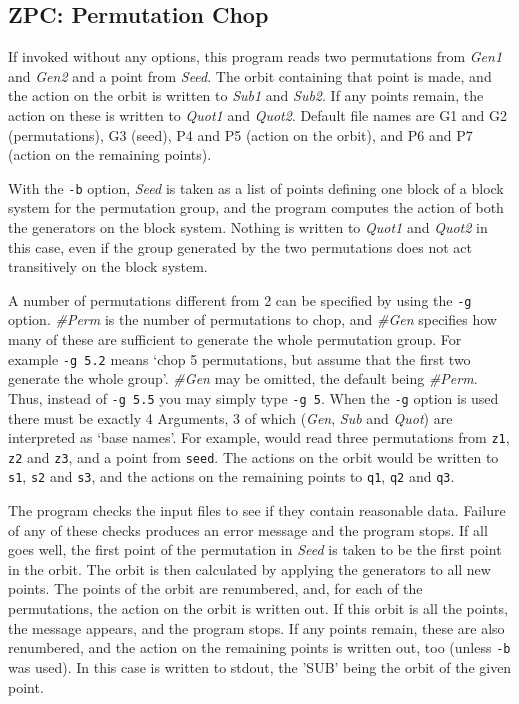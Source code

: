 \subsection{ZPC: Permutation Chop}
\Syntax
{}

\Description
If invoked without any options, this program reads two permutations
from {\it Gen1} and {\it Gen2} and a point from {\it Seed}. The orbit
containing that point is made, and the action on the orbit is written
to {\it Sub1} and {\it Sub2}. If any points remain, the action on these
is written to {\it Quot1} and {\it Quot2}.
Default file names are G1 and G2 (permutations), G3 (seed), P4 and P5
(action on the orbit), and P6 and P7 (action on the remaining points).

With the {\tt -b} option, {\it Seed} is taken as a list of points
defining one block of a block system for the permutation group, and
the program computes the action of both the generators on the block
system. Nothing is written to {\it Quot1} and {\it Quot2} in this case,
even if the group generated by the two permutations does not act
transitively on the block system.

A number of permutations different from 2 can be specified by using the
{\tt -g} option. {\it \#Perm} is the number of permutations to chop, and
{\it \#Gen} specifies how many of these are sufficient to generate the
whole permutation group. For example {\tt -g 5.2} means `chop 5
permutations, but assume that the first two generate the whole group'.
{\it \#Gen} may be omitted, the default being {\it \#Perm}. Thus,
instead of {\tt -g 5.5} you may simply type {\tt -g 5}.
When the {\tt -g} option is used there must be exactly 4 Arguments, 3
of which ({\it Gen}, {\it Sub} and {\it Quot}) are interpreted as
`base names'. For example,
would read three permutations from {\tt z1}, {\tt z2} and {\tt z3},
and a point from {\tt seed}. The actions on the orbit would be
written to {\tt s1}, {\tt s2} and {\tt s3}, and the actions on the
remaining points to {\tt q1}, {\tt q2} and {\tt q3}.

The program checks the input files to see if they contain reasonable
data. Failure of any of these checks produces an error message
and the program stops.
If all goes well, the first point of the permutation in {\it Seed} is
taken to be the first point in the orbit. The orbit is then calculated
by applying the generators to all new points.
The points of the orbit are renumbered, and, for each of the
permutations, the action on the orbit is written out. If this orbit is
all the points, the message
appears, and the program stops. If any points remain, these are also
renumbered, and the action on the remaining points is written out, too
(unless {\tt -b} was used). In this case
is written to stdout, the 'SUB' being the orbit of the given
point.

